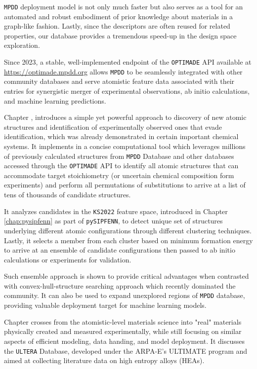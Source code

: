 \texttt{MPDD} deployment model is not only much faster but also serves as a tool for an automated and robust embodiment of prior knowledge about materials in a graph-like fashion. Lastly, since the descriptors are often reused for related properties, our database provides a tremendous speed-up in the design space exploration.

Since 2023, a stable, well-implemented endpoint of the \texttt{OPTIMADE} API available at \href{https://optimade.mpdd.org}{https://optimade.mpdd.org} allows \texttt{MPDD} to be seamlessly integrated with other community databases and serve atomistic feature data associated with their entries for synergistic merger of experimental observations, ab initio calculations, and machine learning predictions.


Chapter , introduces a simple yet powerful approach to discovery of new atomic structures and identification of experimentally observed ones that evade identification, which was already demonstrated in certain important chemical systems. It implements in a concise computational tool which leverages millions of previously calculated structures from \texttt{MPDD} Database and other databases accessed through the \texttt{OPTIMADE} API to identify all atomic structures that can accommodate target stoichiometry (or uncertain chemical composition form experiments) and perform all permutations of substitutions to arrive at a list of tens of thousands of candidate structures. 

It analyzes candidates in the \texttt{KS2022} feature space, introduced in Chapter \ref{chap:pysipfenn} as part of \texttt{pySIPFENN}, to detect unique set of structures underlying different atomic configurations through different clustering techniques. Lastly, it selects a member from each cluster based on minimum formation energy to arrive at an ensemble of candidate configurations then passed to ab initio calculations or experiments for validation. 

Such ensemble approach is shown to provide critical advantages when contrasted with convex-hull-structure searching approach which recently dominated the community. It can also be used to expand unexplored regions of \texttt{MPDD} database, providing valuable deployment target for machine learning models.


Chapter  crosses from the atomistic-level materials science into "real" materials physically created and measured experimentally, while still focusing on similar aspects of efficient modeling, data handing, and model deployment. It discusses the \texttt{ULTERA} Database, developed under the ARPA-E's ULTIMATE program and aimed at collecting literature data on high entropy alloys (HEAs).

